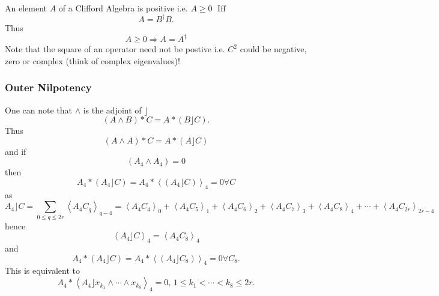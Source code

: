 \documentclass[aps,preprint]{revtex4}%
\begin{document}
An element $A$ of a Clifford Algebra is positive i.e. $A\geq0$
$\operatorname*{Iff}$
\begin{equation}
A=B^{\dagger}B.
\end{equation}
Thus
\begin{equation}
A\geq0\Rightarrow A=A^{\dagger}%
\end{equation}
Note that the square of an operator need not be postive i.e. $C^{2}$ could be
negative, zero or complex (think of complex eigenvalues)!

\subsubsection{Outer Nilpotency}

One can note that $\wedge$ is the adjoint of $\rfloor$
\begin{equation}
\left(  A\wedge B\right)  \ast C=A\ast\left(  B\rfloor C\right)  .
\end{equation}
Thus
\begin{equation}
\left(  A\wedge A\right)  \ast C=A\ast\left(  A\rfloor C\right)
\end{equation}
and if
\begin{equation}
\left(  A_{4}\wedge A_{4}\right)  =0
\end{equation}
then
\begin{equation}
A_{4}\ast\left(  A_{4}\rfloor C\right)  =A_{4}\ast\left\langle \left(
A_{4}\rfloor C\right)  \right\rangle _{4}=0\forall C
\end{equation}
as%
\begin{equation}
A_{4}\rfloor C=\sum_{0\leq q\leq2r}\left\langle A_{4}C_{q}\right\rangle
_{q-4}=\left\langle A_{4}C_{4}\right\rangle _{0}+\left\langle A_{4}%
C_{5}\right\rangle _{1}+\left\langle A_{4}C_{6}\right\rangle _{2}+\left\langle
A_{4}C_{7}\right\rangle _{3}+\left\langle A_{4}C_{8}\right\rangle _{4}%
+\cdots+\left\langle A_{4}C_{2r}\right\rangle _{2r-4}%
\end{equation}
hence
\begin{equation}
\left\langle A_{4}\rfloor C\right\rangle _{4}=\left\langle A_{4}%
C_{8}\right\rangle _{4}%
\end{equation}
and%
\begin{equation}
A_{4}\ast\left(  A_{4}\rfloor C\right)  =A_{4}\ast\left\langle \left(
A_{4}\rfloor C_{8}\right)  \right\rangle _{4}=0\forall C_{8}.
\end{equation}
This is equivalent to
\begin{equation}
A_{4}\ast\left\langle A_{4}\rfloor x_{k_{1}}\wedge\cdots\wedge x_{k_{8}%
}\right\rangle _{4}=0,\,1\leq k_{1}<\cdots<k_{8}\leq2r.
\end{equation}%
\end{document}
